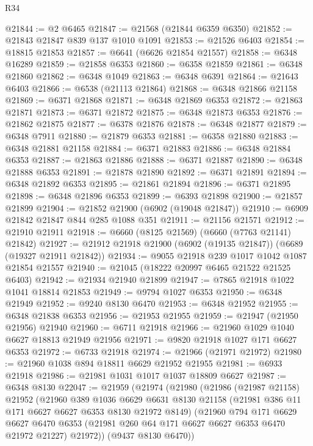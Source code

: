 \begin{lexlean}{R34}
\begin{coremodule}
@21844 := @2 @6465
@21847 := @21568 (@21844 @6359 @6350)
@21852 := @21843 @21847 @839 @137 @1010 @1091
@21853 := @21526 @6403
@21854 := @18815 @21853
@21857 := @6641 (@6626 @21854 @21557)
@21858 := @6348 @16289
@21859 := @21858 @6353
@21860 := @6358 @21859
@21861 := @6348 @21860
@21862 := @6348 @1049
@21863 := @6348 @6391
@21864 := @21643 @6403
@21866 := @6538 (@21113 @21864)
@21868 := @6348 @21866 @21158
@21869 := @6371 @21868
@21871 := @6348 @21869 @6353
@21872 := @21863 @21871
@21873 := @6371 @21872
@21875 := @6348 @21873 @6353
@21876 := @21862 @21875
@21877 := @6378 @21876
@21878 := @6348 @21877
@21879 := @6348 @7911
@21880 := @21879 @6353
@21881 := @6358 @21880
@21883 := @6348 @21881 @21158
@21884 := @6371 @21883
@21886 := @6348 @21884 @6353
@21887 := @21863 @21886
@21888 := @6371 @21887
@21890 := @6348 @21888 @6353
@21891 := @21878 @21890
@21892 := @6371 @21891
@21894 := @6348 @21892 @6353
@21895 := @21861 @21894
@21896 := @6371 @21895
@21898 := @6348 @21896 @6353
@21899 := @6393 @21898
@21900 := @21857 @21899
@21904 := @21852 @21900 (@6902 (@19048 @21847))
@21910 := @6909 @21842 @21847 @844 @285 @1088 @351
@21911 := @21156 @21571
@21912 := @21910 @21911
@21918 := @6660 (@8125 @21569) (@6660 (@7763 @21141) @21842)
@21927 := @21912 @21918 @21900 (@6902 (@19135 @21847)) (@6689 (@19327 @21911 @21842))
@21934 := @9055 @21918 @239 @1017 @1042 @1087 @21854 @21557
@21940 := @21045 (@18222 @20997 @6465 @21522 @21525 @6403)
@21942 := @21934 @21940 @21899
@21947 := @7865 @21918 @1022 @1041 @18814 @21853
@21949 := @9794 @1027 @6353
@21950 := @6348 @21949
@21952 := @9240 @8130 @6470
@21953 := @6348 @21952
@21955 := @6348 @21838 @6353
@21956 := @21953 @21955
@21959 := @21947 (@21950 @21956) @21940
@21960 := @6711 @21918
@21966 := @21960 @1029 @1040 @6627 @18813 @21949 @21956
@21971 := @9820 @21918 @1027 @171 @6627 @6353
@21972 := @6733 @21918
@21974 := @21966 (@21971 @21972)
@21980 := @21960 @1038 @894 @18811 @6629 @21952 @21955
@21981 := @6933 @21918
@21986 := @21981 @1031 @1017 @1037 @18809 @6627
@21987 := @6348 @8130
@22047 := @21959
    (@21974
      (@21980
        (@21986
          (@21987 @21158)
          @21952
          (@21960
            @389
            @1036
            @6629
            @6631
            @8130
            @21158
            (@21981 @386 @11 @171 @6627 @6627 @6353 @8130 @21972 @8149)
            (@21960
              @794
              @171
              @6629
              @6627
              @6470
              @6353
              (@21981 @260 @64 @171 @6627 @6627 @6353 @6470 @21972 @21227)
              @21972))
          (@9437 @8130 @6470))

\end{coremodule}
\end{lexlean}
